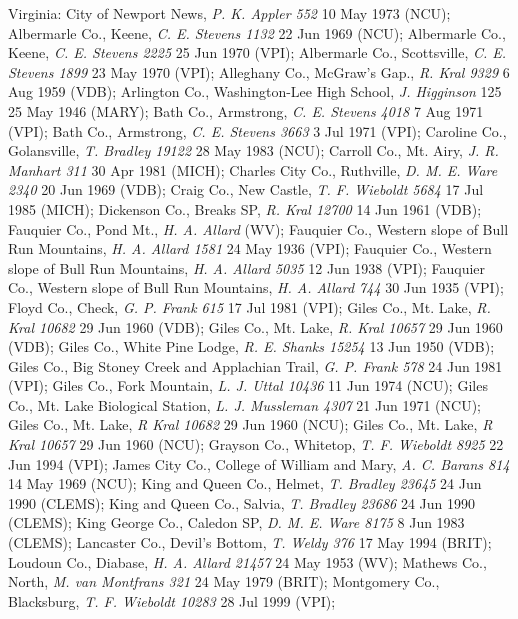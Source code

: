 \documentclass{article}
\begin{document}
Virginia:
City of Newport News, \textit{P. K. Appler 552} 10 May 1973 (NCU);
Albermarle Co., Keene, \textit{C. E. Stevens 1132} 22 Jun 1969 (NCU);
Albermarle Co., Keene, \textit{C. E. Stevens 2225} 25 Jun 1970 (VPI);
Albermarle Co., Scottsville, \textit{C. E. Stevens 1899} 23 May 1970 (VPI);
Alleghany Co., McGraw's Gap., \textit{R. Kral 9329} 6 Aug 1959 (VDB);
Arlington Co., Washington-Lee High School, \textit{J. Higginson} 125 25 May 1946 (MARY);
Bath Co., Armstrong, \textit{C. E. Stevens 4018} 7 Aug 1971 (VPI);
Bath Co., Armstrong, \textit{C. E. Stevens 3663} 3 Jul 1971 (VPI);
Caroline Co., Golansville, \textit{T. Bradley 19122} 28 May 1983 (NCU);
Carroll Co., Mt. Airy, \textit{J. R. Manhart 311} 30 Apr 1981 (MICH);
Charles City Co., Ruthville, \textit{D. M. E. Ware 2340} 20 Jun 1969 (VDB);
Craig Co., New Castle, \textit{T. F. Wieboldt 5684} 17 Jul 1985 (MICH);
Dickenson Co., Breaks SP, \textit{R. Kral 12700} 14 Jun 1961 (VDB);
Fauquier Co., Pond Mt., \textit{H. A. Allard}   (WV);
Fauquier Co., Western slope of Bull Run Mountains, \textit{H. A. Allard 1581} 24 May 1936 (VPI);
Fauquier Co., Western slope of Bull Run Mountains, \textit{H. A. Allard 5035} 12 Jun 1938 (VPI);
Fauquier Co., Western slope of Bull Run Mountains, \textit{H. A. Allard 744} 30 Jun 1935 (VPI);
Floyd Co., Check, \textit{G. P. Frank 615} 17 Jul 1981 (VPI);
Giles Co., Mt. Lake, \textit{R. Kral 10682} 29 Jun 1960 (VDB);
Giles Co., Mt. Lake, \textit{R. Kral 10657} 29 Jun 1960 (VDB);
Giles Co., White Pine Lodge, \textit{R. E. Shanks 15254} 13 Jun 1950 (VDB);
Giles Co., Big Stoney Creek and Applachian Trail, \textit{G. P. Frank 578} 24 Jun 1981 (VPI);
Giles Co., Fork Mountain, \textit{L. J. Uttal 10436} 11 Jun 1974 (NCU);
Giles Co., Mt. Lake Biological Station, \textit{L. J. Mussleman 4307} 21 Jun 1971 (NCU);
Giles Co., Mt. Lake, \textit{R Kral 10682} 29 Jun 1960 (NCU);
Giles Co., Mt. Lake, \textit{R Kral 10657} 29 Jun 1960 (NCU);
Grayson Co., Whitetop, \textit{T. F. Wieboldt 8925} 22 Jun 1994 (VPI);
James City Co., College of William and Mary, \textit{A. C. Barans 814} 14 May 1969 (NCU);
King and Queen Co., Helmet, \textit{T. Bradley 23645} 24 Jun 1990 (CLEMS);
King and Queen Co., Salvia, \textit{T. Bradley 23686} 24 Jun 1990 (CLEMS);
King George Co., Caledon SP, \textit{D. M. E. Ware 8175} 8 Jun 1983 (CLEMS);
Lancaster Co., Devil's Bottom, \textit{T. Weldy 376} 17 May 1994 (BRIT);
Loudoun Co., Diabase, \textit{H. A. Allard 21457} 24 May 1953 (WV);
Mathews Co., North, \textit{M. van Montfrans 321} 24 May 1979 (BRIT);
Montgomery Co., Blacksburg, \textit{T. F. Wieboldt 10283} 28 Jul 1999 (VPI);
\end{document}
